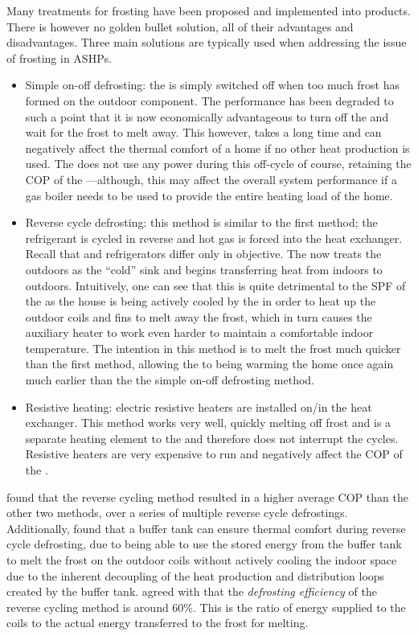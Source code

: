 Many treatments for frosting have been proposed and implemented into products. There is however no golden bullet solution, all of their advantages and disadvantages. Three main solutions are typically used when addressing the issue of frosting in \acp{ASHP}. 
\begin{itemize}
    \item Simple on-off defrosting: the \HP is simply switched off when too much frost has formed on the outdoor component. The performance has been degraded to such a point that it is now economically advantageous to turn off the \HP and wait for the frost to melt away. This however, takes a long time and can negatively affect the thermal comfort of a home if no other heat production is used. The \HP does not use any power during this off-cycle of course, retaining the \ac{COP} of the \HP---although, this may affect the overall system performance if a gas boiler needs to be used to provide the entire heating load of the home.
    \item Reverse cycle defrosting: this method is similar to the first method; the refrigerant is cycled in reverse and hot gas is forced into the heat exchanger. Recall that \HPs and refrigerators differ only in objective. The \HP now treats the outdoors as the ``cold'' sink and begins transferring heat from indoors to outdoors. Intuitively, one can see that this is quite detrimental to the \ac{SPF} of the \HP as the house is being actively cooled by the \HP in order to heat up the outdoor coils and fins to melt away the frost, which in turn causes the auxiliary heater to work even harder to maintain a comfortable indoor temperature. The intention in this method is to melt the frost much quicker than the first method, allowing the \ASHP to being warming the home once again much earlier than the the simple on-off defrosting method.
    \item Resistive heating: electric resistive heaters are installed on/in the heat exchanger. This method works very well, quickly melting off frost and is a separate heating element to the \HP and therefore does not interrupt the \HPs cycles. Resistive heaters are very expensive to run and negatively affect the \ac{COP} of the \HP.
\end{itemize}

\citeauthor{amer_review_2017} \cite{amer_review_2017}found that the reverse cycling method resulted in a higher average \ac{COP} than the other two methods, over a series of multiple reverse cycle defrostings. Additionally, \citeauthor{bagarella_annual_2016} \cite{bagarella_annual_2016} found that a buffer tank can ensure thermal comfort during reverse cycle defrosting, due to being able to use the stored energy from the buffer tank to melt the frost on the outdoor coils without actively cooling the indoor space due to the inherent decoupling of the heat production and distribution loops created by the buffer tank. \citeauthor{bagarella_annual_2016} \cite{bagarella_annual_2016} agreed with \citeauthor{dong_2012} \cite{dong_2012} that the \textit{defrosting efficiency} of the reverse cycling method is around 60\%. This is the ratio of energy supplied to the coils to the actual energy transferred to the frost for melting. 

